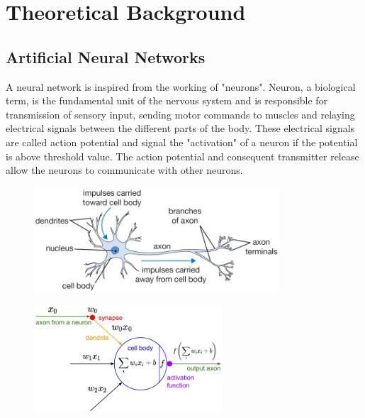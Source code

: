 \chapter{Theoretical Background} %
\label{chap:theoretical_background}

\section{Artificial Neural Networks}

A neural network is inspired from the working of "neurons". Neuron, a biological term, is the fundamental unit of the nervous system and is responsible for transmission of sensory input, sending motor commands to muscles and relaying electrical signals between the different parts of the body. These electrical signals are called action potential and signal the "activation" of a neuron if the potential is above threshold value. The action potential and consequent transmitter release allow the neurons to communicate with other neurons.
\begin{figure}[ht]
\centering
\begin{minipage}{.5\textwidth}
  \centering
  \includegraphics[width=1.2\linewidth, height=3.90cm]{BachelorMasterThesis/TheoreticalBackground/Figures/Biological_Neuron.png}
  \label{fig:biological_neuron}
\end{minipage}%
\begin{minipage}{.5\textwidth}
  \centering
  \includegraphics[width=1.0\linewidth, height=4cm]{BachelorMasterThesis/TheoreticalBackground/Figures/Mathematical_Neuron_Model.jpeg}
  \label{fig:mathemetical_model}
\end{minipage}
\end{figure}

